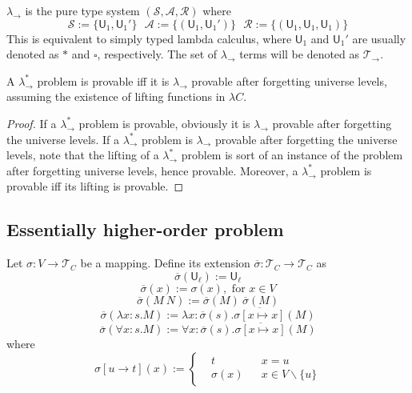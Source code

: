 \begin{definition} $\lambda_\to$ is the pure type system $(\mathcal{S}, \mathcal{A}, \mathcal{R})$ where
  $$\mathcal{S} := \{\mathsf{U}_1, \mathsf{U}_1'\} \ \ \ \mathcal{A} := \{(\mathsf{U}_1, \mathsf{U}_1')\} \ \ \ 
    \mathcal{R} := \{(\mathsf{U}_1, \mathsf{U}_1, \mathsf{U}_1)\}$$
  This is equivalent to simply typed lambda calculus, where $\mathsf{U}_1$ and $\mathsf{U}_1'$ are
  usually denoted as $*$ and $\square$, respectively. The set of $\lambda_\to$ terms will be denoted
  as $\mathcal{T}_\to$.
\end{definition}

\begin{theorem} A $\lambda_\to^*$ problem is provable iff it is $\lambda_\to$ provable after forgetting
  universe levels, assuming the existence of lifting functions in $\lambda C$.
\end{theorem}
\begin{proof}
  If a $\lambda_\to^*$ problem is provable, obviously it is $\lambda_\to$ provable
  after forgetting the universe levels. If a $\lambda_\to^*$ problem is $\lambda_\to$ provable
  after forgetting the universe levels, note that the lifting of a $\lambda_\to^*$ problem is sort of
  an instance of the problem after forgetting universe levels, hence provable. Moreover,
  a $\lambda_\to^*$ problem is provable iff its lifting is provable.  
\end{proof}

\subsection{Essentially higher-order problem}

\begin{definition} Let $\sigma : V \to \mathcal{T}_C$ be a mapping.
  Define its extension $\overline{\sigma} : \mathcal{T}_C \to \mathcal{T}_C$ as
  $$\overline{\sigma}(\mathsf{U}_\ell) := \mathsf{U}_\ell$$
  $$\overline{\sigma}(x) := \sigma(x), \text{ for }x \in V$$
  $$\overline{\sigma}(M \ N) := \overline{\sigma}(M) \ \overline{\sigma}(M)$$
  $$\overline{\sigma}(\lambda x : s. M) := \lambda x : \overline{\sigma}(s). \overline{\sigma[x \mapsto x]}(M)$$
  $$\overline{\sigma}(\forall x : s. M) := \forall x : \overline{\sigma}(s). \overline{\sigma[x \mapsto x]}(M)$$
  where
  $$\sigma[u \to t](x) := \left\{\begin{aligned}
    & t & & x = u \\
    & \sigma(x) & & x \in V \backslash \{u\}
  \end{aligned}\right.$$
\end{definition}

